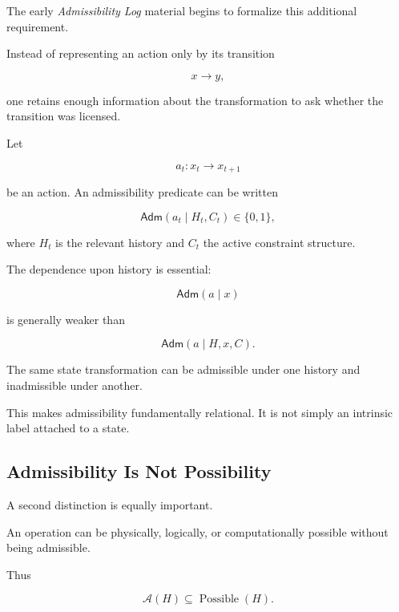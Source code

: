 \documentclass[11pt]{article}
\theoremstyle{remark}
\newcommand{\Adm}{\mathcal{A}}
\begin{document}
The early \emph{Admissibility Log} material begins to formalize this additional requirement.

Instead of representing an action only by its transition

\begin{equation}
x\rightarrow y,
\end{equation}

one retains enough information about the transformation to ask whether the transition was licensed.

Let

\begin{equation}
a_t
:
x_t\rightarrow x_{t+1}
\end{equation}

be an action. An admissibility predicate can be written

\begin{equation}
\mathsf{Adm}
\left(
a_t
\mid
H_t,C_t
\right)
\in
\{0,1\},
\end{equation}

where $H_t$ is the relevant history and $C_t$ the active constraint structure.

The dependence upon history is essential:

\begin{equation}
\mathsf{Adm}(a\mid x)
\end{equation}

is generally weaker than

\begin{equation}
\mathsf{Adm}(a\mid H,x,C).
\end{equation}

The same state transformation can be admissible under one history and inadmissible under another.

This makes admissibility fundamentally relational. It is not simply an intrinsic label attached to a state.

\subsection{Admissibility Is Not Possibility}

A second distinction is equally important.

An operation can be physically, logically, or computationally possible without being admissible.

Thus

\begin{equation}
\Adm(H)
\subseteq
\operatorname{Possible}(H).
\end{equation}
\end{document}

